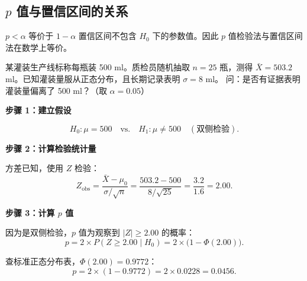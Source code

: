 \subsection{$p$ 值与置信区间的关系}

$p < \alpha$ 等价于 $1-\alpha$ 置信区间不包含 $H_0$ 下的参数值。因此 $p$ 值检验法与置信区间法在数学上等价。

\begin{example}[$p$ 值检验法完整演示]
某灌装生产线标称每瓶装 500 ml。质检员随机抽取 $n = 25$ 瓶，测得
$\bar{X} = 503.2$ ml。已知灌装量服从正态分布，且长期记录表明 $\sigma = 8$ ml。
问：是否有证据表明灌装量偏离了 500 ml？（取 $\alpha = 0.05$）

\medskip
\textbf{步骤 1：建立假设}

\begin{equation}
    H_0: \mu = 500 \quad \text{vs.} \quad H_1: \mu \neq 500 \quad (\text{双侧检验}).
\end{equation}

\textbf{步骤 2：计算检验统计量}

方差已知，使用 $Z$ 检验：
\begin{equation}
    Z_{\text{obs}} = \frac{\bar{X} - \mu_0}{\sigma/\sqrt{n}}
                   = \frac{503.2 - 500}{8/\sqrt{25}}
                   = \frac{3.2}{1.6}
                   = 2.00.
\end{equation}

\textbf{步骤 3：计算 $p$ 值}

因为是双侧检验，$p$ 值为观察到 $|Z| \ge 2.00$ 的概率：
\begin{equation}
    p = 2 \times P(Z \ge 2.00 \mid H_0)
      = 2 \times \bigl(1 - \Phi(2.00)\bigr).
\end{equation}

查标准正态分布表，$\Phi(2.00) = 0.9772$：
\begin{equation}
    p = 2 \times (1 - 0.9772) = 2 \times 0.0228 = 0.0456.
\end{equation}


\end{example}
